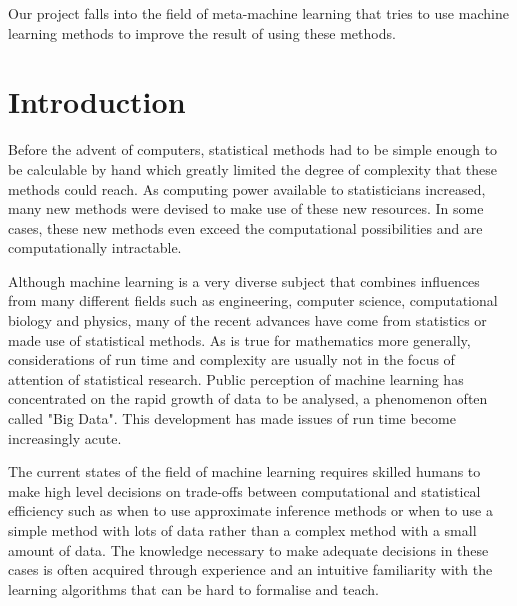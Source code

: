 \documentclass[a4paper,12pt,twoside,openright]{report}
\begin{document}
\pagestyle{empty}
\singlespacing

\onehalfspacing

\singlespacing


Our project falls into the field of meta-machine learning that tries to use machine learning methods to improve the result of using these methods.

\setcounter{page}{0}
\pagestyle{plain}
\tableofcontents
\listoffigures
\listoftables

\onehalfspacing


\chapter{Introduction}

\setcounter{page}{1}
Before the advent of computers, statistical methods had to be simple enough to be calculable by hand which greatly limited the degree of complexity that these methods could reach. As computing power available to statisticians increased, many new methods were devised to make use of these new resources. In some cases, these new methods even exceed the computational possibilities and are computationally intractable. 

Although machine learning is a very diverse subject that combines influences from many different fields such as engineering, computer science, computational biology and physics, many of the recent advances have come from statistics or made use of statistical methods. As is true for mathematics more generally, considerations of run time and complexity are usually not in the focus of attention of statistical research. Public perception of machine learning has concentrated on the rapid growth of data to be analysed, a phenomenon often called "Big Data". This development has made issues of run time become increasingly acute. 

The current states of the field of machine learning requires skilled humans to make high level decisions on trade-offs between computational and statistical efficiency such as when to use approximate inference methods or when to use a simple method with lots of data rather than a complex method with a small amount of data. The knowledge necessary to make adequate decisions in these cases is often acquired through experience and an intuitive familiarity with the learning algorithms that can be hard to formalise and teach.
\end{document}
